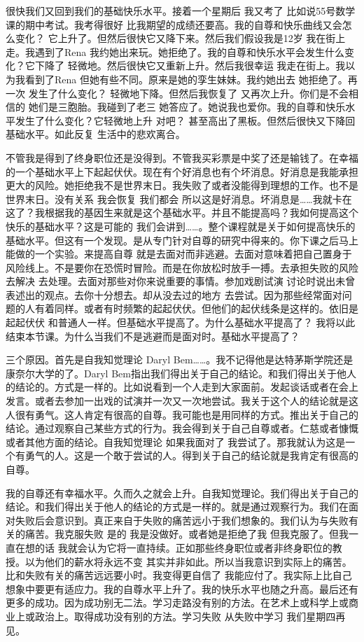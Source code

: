 很快我们又回到我们的基础快乐水平。接着一个星期后 我又考了 比如说55号数学课的期中考试。我考得很好 比我期望的成绩还要高。我的自尊和快乐曲线又会怎么变化？ 它上升了。但然后很快它又降下来。然后我们假设我是12岁 我在街上走。我遇到了Rena 我约她出来玩。她拒绝了。我的自尊和快乐水平会发生什么变化？它下降了 轻微地。然后很快它又重新上升。然后我很幸运 我走在街上。我以为我看到了Rena 但她有些不同。原来是她的孪生妹妹。我约她出去 她拒绝了。再一次 发生了什么变化？ 轻微地下降。但然后我恢复了 又再次上升。你们是不会相信的 她们是三胞胎。我碰到了老三 她答应了。她说我也爱你。我的自尊和快乐水平发生了什么变化？它轻微地上升 对吧？ 甚至高出了黑板。但然后很快又下降回基础水平。如此反复 生活中的悲欢离合。 

不管我是得到了终身职位还是没得到。不管我买彩票是中奖了还是输钱了。在幸福的一个基础水平上下起起伏伏。现在有个好消息也有个坏消息。好消息是我能承担更大的风险。她拒绝我不是世界末日。我失败了或者没能得到理想的工作。也不是世界末日。没有关系 我会恢复 我们都会 所以这是好消息。坏消息是……我就卡在这了？我根据我的基因生来就是这个基础水平。并且不能提高吗？我如何提高这个快乐的基础水平？这是可能的 我们会讲到……。整个课程就是关于如何提高快乐的基础水平。但这有一个发现。是从专门针对自尊的研究中得来的。你下课之后马上能做的一个实验。来提高自尊 就是去面对而非逃避。去面对意味着把自己置身于风险线上。不是要你在恐慌时冒险。而是在你放松时放手一搏。去承担失败的风险 去解决 去处理。去面对那些对你来说重要的事情。参加戏剧试演 讨论时说出未曾表述出的观点。去你十分想去。却从没去过的地方 去尝试。因为那些经常面对问题的人有着同样。或者有时频繁的起起伏伏。但他们的起伏线条是这样的。依旧是起起伏伏 和普通人一样。但基础水平提高了。为什么基础水平提高了？ 我将以此结束本节课。为什么当我们不是逃避而是面对时。基础水平提高了？ 

三个原因。首先是自我知觉理论 Daryl Bem……。我不记得他是达特茅斯学院还是康奈尔大学的了。Daryl Bem指出我们得出关于自己的结论。和我们得出关于他人的结论的。方式是一样的。比如说看到一个人走到大家面前。发起谈话或者在会上发言。或者去参加一出戏的试演并一次又一次地尝试。我关于这个人的结论就是这人很有勇气。这人肯定有很高的自尊。我可能也是用同样的方式。推出关于自己的结论。通过观察自己某些方式的行为。我会得到关于自己自尊或者。仁慈或者慷慨或者其他方面的结论。自我知觉理论 如果我面对了 我尝试了。那我就认为这是一个有勇气的人。这是一个敢于尝试的人。得到关于自己的结论就是我肯定有很高的自尊。 

我的自尊还有幸福水平。久而久之就会上升。自我知觉理论。我们得出关于自己的结论。和我们得出关于他人的结论的方式是一样的。就是通过观察行为。我们在面对失败后会意识到。真正来自于失败的痛苦远小于我们想象的。我们认为与失败有关的痛苦。我克服失败 是的 我是没做好。或者她是拒绝了我 但我克服了。但我一直在想的话 我就会认为它将一直持续。正如那些终身职位或者非终身职位的教授。以为他们的薪水将永远不变 其实并非如此。所以当我意识到实际上的痛苦。比和失败有关的痛苦远远要小时。我变得更自信了 我能应付了。我实际上比自己想象中要更有适应力。我的自尊水平上升了。我的快乐水平也随之升高。最后还有更多的成功。因为成功别无二法。学习走路没有别的方法。在艺术上或科学上或商业上或政治上。取得成功没有别的方法。学习失败 从失败中学习 我们星期四再见。 

